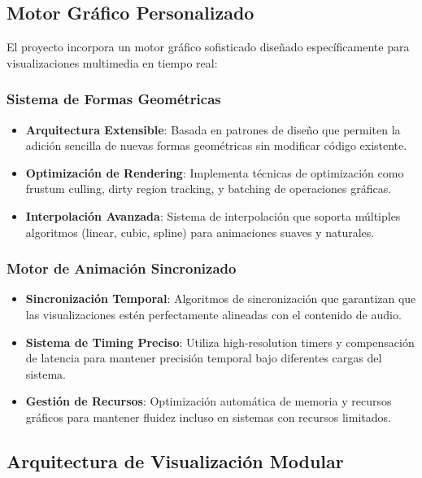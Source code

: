 \documentclass[a4paper]{article}
\begin{document}
\subsection{Motor Gráfico Personalizado}

El proyecto incorpora un motor gráfico sofisticado diseñado específicamente para visualizaciones multimedia en tiempo real:

\subsubsection{Sistema de Formas Geométricas}

\begin{itemize}
\item \textbf{Arquitectura Extensible}: Basada en patrones de diseño que permiten la adición sencilla de nuevas formas geométricas sin modificar código existente.

\item \textbf{Optimización de Rendering}: Implementa técnicas de optimización como frustum culling, dirty region tracking, y batching de operaciones gráficas.

\item \textbf{Interpolación Avanzada}: Sistema de interpolación que soporta múltiples algoritmos (linear, cubic, spline) para animaciones suaves y naturales.
\end{itemize}

\subsubsection{Motor de Animación Sincronizado}

\begin{itemize}
\item \textbf{Sincronización Temporal}: Algoritmos de sincronización que garantizan que las visualizaciones estén perfectamente alineadas con el contenido de audio.

\item \textbf{Sistema de Timing Preciso}: Utiliza high-resolution timers y compensación de latencia para mantener precisión temporal bajo diferentes cargas del sistema.

\item \textbf{Gestión de Recursos}: Optimización automática de memoria y recursos gráficos para mantener fluidez incluso en sistemas con recursos limitados.
\end{itemize}

\subsection{Arquitectura de Visualización Modular}
\end{document}
